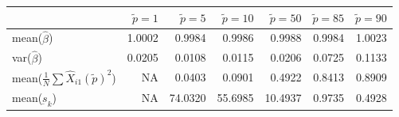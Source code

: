 
\begin{tabular}{lrrrrrr}
\toprule
  & $\tilde{p}=1$ & $\tilde{p}=5$ & $\tilde{p}=10$ & $\tilde{p}=50$ & $\tilde{p}=85$ & $\tilde{p}=90$\\
\midrule
mean($\hat{\beta}$) & 1.0002 & 0.9984 & 0.9986 & 0.9988 & 0.9984 & 1.0023\\
var($\hat{\beta}$) & 0.0205 & 0.0108 & 0.0115 & 0.0206 & 0.0725 & 0.1133\\
mean($\frac{1}{N}\sum \hat{X}_{i1}(\tilde{p})^2$) & NA & 0.0403 & 0.0901 & 0.4922 & 0.8413 & 0.8909\\
mean($\underbar{s}_k$) & NA & 74.0320 & 55.6985 & 10.4937 & 0.9735 & 0.4928\\
\bottomrule
\end{tabular}
